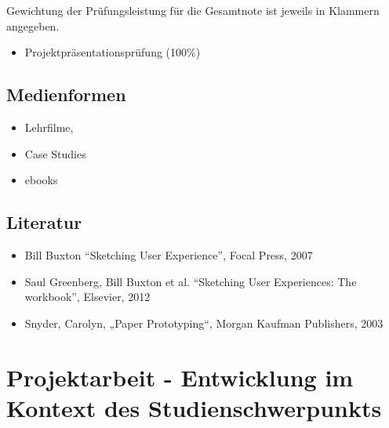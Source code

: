 Gewichtung der Prüfungsleistung für die Gesamtnote ist jeweils in
Klammern angegeben.

\begin{itemize}
\tightlist
\item
  Projektpräsentationsprüfung (100\%)
\end{itemize}

\section*{Medienformen\label{/mi-2017/modulbeschreibungen-master/MA_HCI_Sketching_and_Designing_for_User_Experience}}\label{medienformenpathlabelmi-2017modulbeschreibungen-mastermaux5fhciux5fsketchingux5fandux5fdesigningux5fforux5fuserux5fexperience}

\begin{itemize}
\tightlist
\item
  Lehrfilme,
\item
  Case Studies
\item
  ebooks
\end{itemize}

\section*{Literatur\label{/mi-2017/modulbeschreibungen-master/MA_HCI_Sketching_and_Designing_for_User_Experience}}\label{literaturpathlabelmi-2017modulbeschreibungen-mastermaux5fhciux5fsketchingux5fandux5fdesigningux5fforux5fuserux5fexperience}

\begin{itemize}
\tightlist
\item
  Bill Buxton ``Sketching User Experience'', Focal Press, 2007
\item
  Saul Greenberg, Bill Buxton et al. ``Sketching User Experiences: The
  workbook'', Elsevier, 2012
\item
  Snyder, Carolyn, „Paper Prototyping``, Morgan Kaufman Publishers, 2003
\end{itemize}

\chapter{Projektarbeit - Entwicklung im Kontext des
Studienschwerpunkts\label{/mi-2017/modulbeschreibungen-master/MA_Modul_Projekt_Entwicklung}}\label{projektarbeit---entwicklung-im-kontext-des-studienschwerpunktspathlabelmi-2017modulbeschreibungen-mastermaux5fmodulux5fprojektux5fentwicklung}

